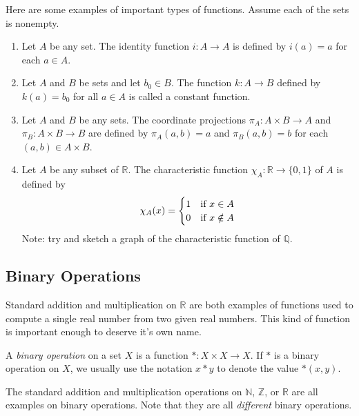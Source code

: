 \begin{example}\label{eg:funcs}
Here are some examples of important types of functions.  Assume each of the sets is nonempty.
\begin{enumerate}
\item Let $A$ be any set.  The \/{\rm identity function} $i:A\to A$ is defined by $i(a)=a$ for each $a\in A$.

\item Let $A$ and $B$ be sets and let $b_0\in B$.  The function $k:A\to B$ defined by $k(a)=b_0$ for all $a\in A$ is called a \/{\rm constant function}. 

\item Let $A$ and $B$ be any sets.  The \/{\rm coordinate projections} $\pi_A:A\times B\to A$ and $\pi_B:A\times B\to B$ are defined by $\pi_A(a,b)=a$ and $\pi_B(a,b)=b$ for each $(a,b)\in A\times B$. 

\item Let $A$ be any subset of $\mathbb R$.  The \/ {\rm characteristic function} $\chi_A:\mathbb R\to\{0,1\}$ of $A$ is defined by \[\chi_A(x) =\begin{cases}1 & \mbox{if } x\in A\cr 0 & \mbox{if } x\notin A\end{cases}\] Note: try and sketch a graph of the characteristic function of $\mathbb Q$.
\end{enumerate}
\end{example}

\subsection{Binary Operations}

Standard addition and multiplication on $\mathbb R$ are both examples of functions used to compute a single real number from two given real numbers.  This kind of function is important enough to deserve it's own name.

\begin{definition}
A \emph{binary operation} on a set $X$ is a function $*:X\times X\to X$.  If $*$ is a binary operation on $X$, we usually use the notation $x*y$ to denote the value $*(x,y)$.
\end{definition}

\begin{example}
The standard addition and multiplication operations on $\mathbb N$, $\mathbb Z$, or $\mathbb R$ are all examples on binary operations. Note that they are all \emph{different} binary operations.
\end{example}

